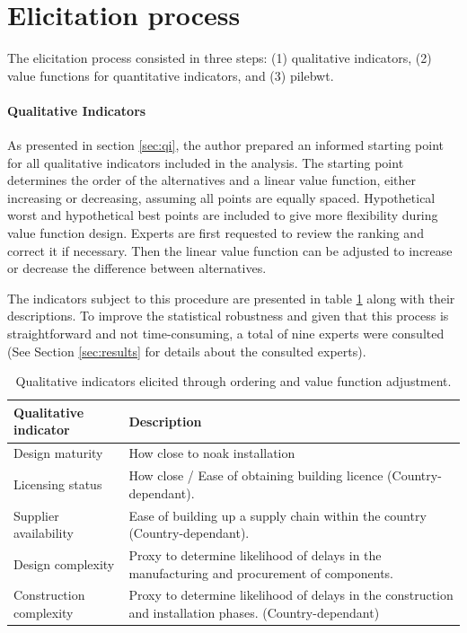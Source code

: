 \section{Elicitation process}
The elicitation process consisted in three steps: (1) qualitative indicators, (2) value functions for quantitative indicators, and (3) \gls{pilebwt}.

\paragraph{Qualitative Indicators}
\label{sec:qualitative_indicators_uncertanty}
As presented in section \ref{sec:qi}, the author prepared an informed starting point for all qualitative indicators included in the analysis. The starting point determines the order of the alternatives and a linear value function, either increasing or decreasing, assuming all points are equally spaced. Hypothetical worst and hypothetical best points are included to give more flexibility during value function design. Experts are first requested to review the ranking and correct it if necessary. Then the linear value function can be adjusted to increase or decrease the difference between alternatives.


The indicators subject to this procedure are presented in table \ref{eq:qi_indicators} along with their descriptions. To improve the statistical robustness and given that this process is straightforward and not time-consuming, a total of nine experts were consulted (See Section \ref{sec:results} for details about the consulted experts).

\begin{table}[!ht]
    \centering
    \caption{Qualitative indicators elicited through ordering and value function adjustment.}
    \label{eq:qi_indicators}
    \begin{tabularx}{\textwidth}{lX}
        \toprule
        \textbf{Qualitative indicator} & \textbf{Description} \\
        \midrule
        Design maturity & How close to \gls{noak} installation \\
        Licensing status & How close / Ease of obtaining building licence (Country-dependant). \\
        Supplier availability & Ease of building up a supply chain within the country (Country-dependant). \\
        Design complexity & Proxy to determine likelihood of delays in the manufacturing and procurement of components. \\
        Construction complexity & Proxy to determine likelihood of delays in the construction and installation phases. (Country-dependant) \\
        \bottomrule
    \end{tabularx}
\end{table}

